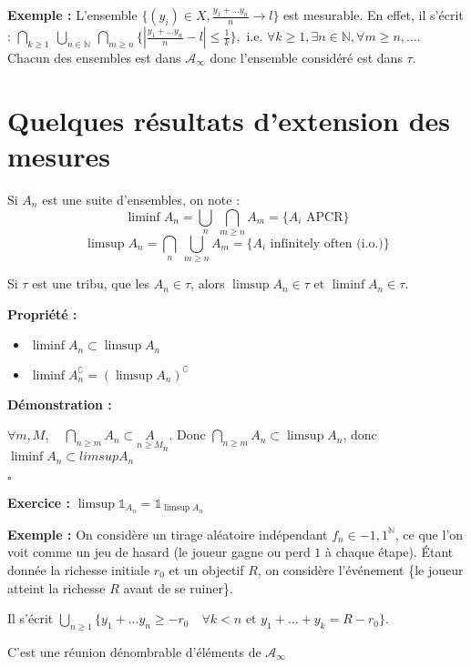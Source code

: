 \documentclass[10pt,a4paper,notitlepage ]{report}
\newcommand{\comp}[1]{#1^\complement}
\newcounter{th}
\newenvironment{propriete}[1][]{
	\begin{tcolorbox}
		\textbf{Propriété #1 : }
}
{\end{tcolorbox}}
\newenvironment{demo}[1][]{

	\textbf{Démonstration #1 :}
}{\begin{flushright}
	$\square$
\end{flushright}
}
\newenvironment{exo}{
	
	\textbf{Exercice :} }{}
\newenvironment{exemple}{
	
	\textbf{Exemple :} }{}
\begin{document}
\begin{exemple}
	L'ensemble $\{(y_i)\in X, \frac{y_1 + \dots y_n}{n} \rightarrow l\}$ est mesurable. En effet, il s'écrit : $\underset{k\ge 1}{\bigcap}\ \underset{n\in \mathbb N}{\bigcup}\ \underset{m \ge n}{\bigcap} \{\left| \frac{y_1+ \dots y_n}{n} - l \right| \le \frac{1}{k}\}, \text{ i.e. } \forall k \ge 1, \exists n\in \mathbb N, \forall m\ge n, \dots$. 
	Chacun des ensembles est dans $\mathcal A_\infty$ donc l'ensemble considéré est dans $\tau$.
\end{exemple}

\section{Quelques résultats d'extension des mesures}
	Si $A_n$ est une suite d'ensembles, on note :
	\[ \liminf A_n = \underset{n}{\bigcup}\ \underset{m\ge n}{\bigcap} A_m = \{A_i \text{ APCR}\}\]
	\[ \limsup A_n = \underset{n}{\bigcap}\ \underset{m\ge n}{\bigcup} A_m = \{A_i \text{ infinitely often (i.o.)}\}\]
	
	Si $\tau$ est une tribu, que les $A_n \in \tau$, alors $\limsup A_n \in \tau$ et $\liminf A_n \in \tau$.
	
	\begin{propriete}
		\begin{itemize}
			\item $\liminf A_n \subset \limsup A_n$
			\item $\liminf \comp{A_n}= \comp{(\limsup A_n)}$
		\end{itemize}
	\end{propriete}
	\begin{demo}
		$\forall m,M, \quad \underset{n\ge m}{\bigcap} A_n \subset \underset{n \ge M} A_n$.
		Donc $\underset{n\ge m}{\bigcap} A_n \subset \limsup A_n$, donc $\liminf A_n \subset limsup A_n$
	\end{demo}
\begin{exo}
	$\limsup \mathds 1_{A_n} = \mathds 1_{\limsup A_n}$
\end{exo}

\begin{exemple}
	On considère un tirage aléatoire indépendant $f_n \in {-1, 1}^{\mathbb N}$, ce que l'on voit comme un jeu de hasard (le joueur gagne ou perd $1$ à chaque étape). Étant donnée la richesse initiale $r_0$ et un objectif $R$, on considère l'événement \{le joueur atteint la richesse $R$ avant de se ruiner\}.
	
	Il s'écrit $\underset{n \ge 1}{\bigcup} \{y_1 + \dots y_n \ge -r_0 \quad \forall k < n \text{ et } y_1 + \dots + y_k = R-r_0\}$.
	
	C'est une réunion dénombrable d'éléments de $\mathcal A_\infty$
\end{exemple}
\end{document}
